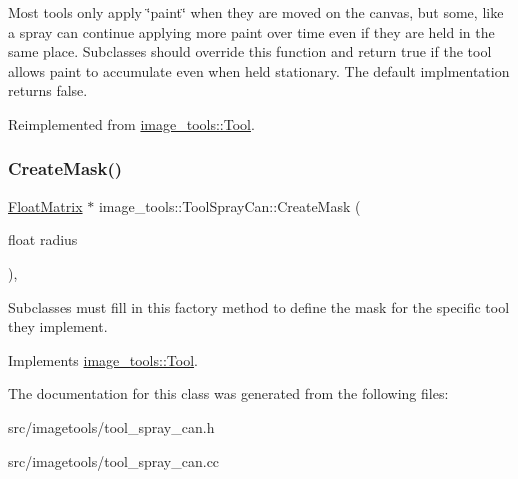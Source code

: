Most tools only apply \char`\"{}paint\char`\"{} when they are moved on the canvas, but some, like a spray can continue applying more paint over time even if they are held in the same place. Subclasses should override this function and return true if the tool allows paint to accumulate even when held stationary. The default implmentation returns false. 

Reimplemented from \hyperlink{classimage__tools_1_1Tool_a84b6d2c885d11cf1990a3c7a1343a05f}{image\+\_\+tools\+::\+Tool}.

\mbox{\label{classimage__tools_1_1ToolSprayCan_acac77013717667f64c9ffaedf621b553}} 
\subsubsection{\texorpdfstring{Create\+Mask()}{CreateMask()}}
{\footnotesize\ttfamily \hyperlink{classimage__tools_1_1FloatMatrix}{Float\+Matrix} $\ast$ image\+\_\+tools\+::\+Tool\+Spray\+Can\+::\+Create\+Mask (\begin{DoxyParamCaption}\item[{float}]{radius }\end{DoxyParamCaption})\hspace{0.3cm}{\ttfamily [override]}, {\ttfamily [virtual]}}

Subclasses must fill in this factory method to define the mask for the specific tool they implement. 

Implements \hyperlink{classimage__tools_1_1Tool_a7d58325846dbc0467e52221daa1310a7}{image\+\_\+tools\+::\+Tool}.



The documentation for this class was generated from the following files\+:\begin{DoxyCompactItemize}
\item 
src/imagetools/tool\+\_\+spray\+\_\+can.\+h\item 
src/imagetools/tool\+\_\+spray\+\_\+can.\+cc\end{DoxyCompactItemize}

